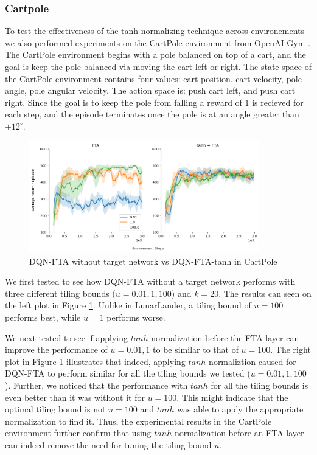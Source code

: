 \documentclass{article}
\begin{document}
\subsubsection{Cartpole}
To test the effectiveness of the tanh normalizing technique across environements we also performed experiments on the CartPole environment from OpenAI Gym \cite{brockman2016gym}.
The CartPole environment begins with a pole balanced on top of a cart, and the goal is keep the pole balanced via moving the cart left or right.
The state space of the CartPole environment contains four values: cart position. cart velocity, pole angle, pole angular velocity. 
The action space is: push cart left, and push cart right.
Since the goal is to keep the pole from falling a reward of $1$ is recieved for each step, and the episode terminates once the pole is at an angle greater than $\pm 12^\circ$.

\begin{figure}[h]
    \centering
    \includegraphics[width=10cm]{cartpole.png}
    \caption{DQN-FTA without target network vs DQN-FTA-tanh in CartPole}
    \label{fig:cartpole}
\end{figure}


We first tested to see how DQN-FTA without a target network performs with three different tiling bounds ($u=0.01, 1, 100$) and $k=20$.
The results can seen on the left plot in Figure \ref{fig:cartpole}. 
Unlike in LunarLander, a tiling bound of $u=100$ performs best, while $u=1$ performs worse.

We next tested to see if applying $tanh$ normalization before the FTA layer can improve the performance of $u=0.01, 1$ to be similar to that of $u=100$.
The right plot in Figure \ref{fig:cartpole} illustrates that indeed, applying $tanh$ normaliztion caused for DQN-FTA to perform similar for all the tiling bounds we tested ($u=0.01, 1, 100$).
Further, we noticed that the performance with $tanh$ for all the tiling bounds is even better than it was without it for $u=100$.
This might indicate that the optimal tiling bound is not $u=100$ and $tanh$ was able to apply the appropriate normalization to find it.
Thus, the experimental results in the CartPole environment further confirm that using $tanh$ normalization before an FTA layer can indeed remove the need for tuning the tiling bound $u$.
\end{document}
